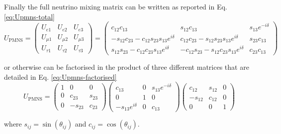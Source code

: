 Finally the full neutrino mixing matrix can be written as reported in Eq. \ref{eq:Upmns-total}
\begin{equation}
    \label{eq:Upmns-total}
    U_{\text{PMNS}} = 
    \begin{pmatrix}
    U_{e1} & U_{e2} & U_{e3} \\
    U_{\mu 1} & U_{\mu 2} & U_{\mu 3} \\
    U_{\tau 1} & U_{\tau 2} & U_{\tau 3}
    \end{pmatrix}
    =
    \begin{pmatrix}
    c_{12}c_{13} & s_{12}c_{13} & s_{13}e^{-i\delta} \\[1ex]
    -s_{12}c_{23} - c_{12}s_{23}s_{13}e^{i\delta} & c_{12}c_{23} - s_{12}s_{23}s_{13}e^{i\delta} & s_{23}c_{13} \\[1ex]
    s_{12}s_{23} - c_{12}c_{23}s_{13}e^{i\delta} & -c_{12}s_{23} - s_{12}c_{23}s_{13}e^{i\delta} & c_{23}c_{13}
    \end{pmatrix}
\end{equation}

or otherwise can be factorised in the product of three different matrices that are detailed in Eq. \ref{eq:Upmns-factorised}
\begin{equation}
    \label{eq:Upmns-factorised}
    U_{\text{PMNS}} = 
    \begin{pmatrix}
    1 & 0 & 0 \\
    0 & c_{23} & s_{23} \\
    0 & -s_{23} & c_{23}
    \end{pmatrix}
    \begin{pmatrix}
    c_{13} & 0 & s_{13}e^{-i\delta} \\
    0 & 1 & 0 \\
    -s_{13}e^{i\delta} & 0 & c_{13}
    \end{pmatrix}
    \begin{pmatrix}
    c_{12} & s_{12} & 0 \\
    -s_{12} & c_{12} & 0 \\
    0 & 0 & 1
    \end{pmatrix}
\end{equation}

where $s_{ij} = \sin(\theta_{ij})$ and $c_{ij} = \cos(\theta_{ij})$.


